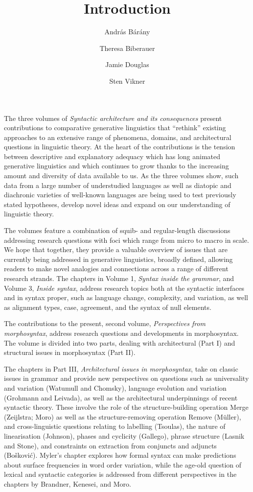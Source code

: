 \documentclass[output=paper]{langsci/langscibook}
\author{András Bárány\affiliation{Bielefeld University}\and
        Theresa Biberauer\affiliation{University of Cambridge, Stellenbosch
        University, University of the West Cape}\and
        Jamie Douglas\affiliation{University of Cambridge}\and
        Sten Vikner\affiliation{Aarhus University}}
\title{Introduction}
\begin{document}
\noindent The three volumes of \emph{Syntactic architecture and its
consequences} present contributions to comparative generative linguistics that
\enquote{rethink} existing approaches to an extensive range of phenomena,
domains, and architectural questions in linguistic theory. At the heart of the
contributions is the tension between descriptive and explanatory adequacy which
has long animated generative linguistics and which continues to grow thanks to
the increasing amount and diversity of data available to us. As the three
volumes show, such data from a large number of understudied languages as well
as diatopic and diachronic varieties of well-known languages are being used to
test previously stated hypotheses, develop novel ideas and expand on our
understanding of linguistic theory.

The volumes feature a combination of squib- and regular-length discussions
addressing research questions with foci which range from micro to macro in
scale. We hope that together, they provide a valuable overview of issues that
are currently being addressed in generative linguistics, broadly defined,
allowing readers to make novel analogies and connections across a range of
different research strands. The chapters in Volume 1, \emph{Syntax inside the
grammar}, and Volume 3, \emph{Inside syntax}, address research topics both at
the syntactic interfaces and in syntax proper, such as language change,
complexity, and variation, as well as alignment types, case, agreement, and the
syntax of null elements.

The contributions to the present, second volume, \emph{Perspectives from
morphosyntax}, address research questions and developments in morphosyntax.
The volume is divided into two parts, dealing with architectural (Part I) and
structural issues in morphosyntax (Part II).

The chapters in Part III, \emph{Architectural issues in morphosyntax}, take on
classic issues in grammar and provide new perspectives on questions such as
universality and variation (Watumull and Chomsky), language evolution and
variation (Grohmann and Leivada), as well as the architectural underpinnings of
recent syntactic theory. These involve the role of the structure-building
operation Merge (Zeijlstra; Moro) as well as the structure-removing operation
Remove (Müller), and cross-linguistic questions relating to labelling
(Tsoulas), the nature of linearisation (Johnson), phases and cyclicity
(Gallego), phrase structure (Lasnik and Stone), and constraints on extraction
from conjuncts and adjuncts (Bošković). Myler’s chapter explores how formal
syntax can make predictions about surface frequencies in word order variation,
while the age-old question of lexical and syntactic categories is addressed
from different perspectives in the chapters by Brandner, Kenesei, and Moro.
\end{document}

